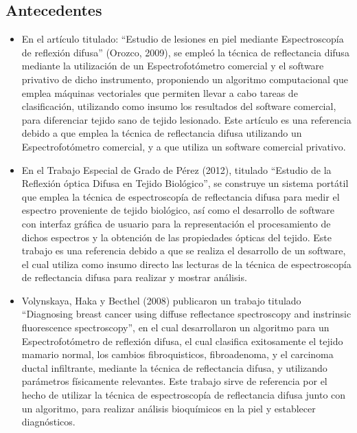 \documentclass[12pt, a4paper]{article}
\begin{document}
\subsection{Antecedentes}	
	\begin{itemize}
		\item En el art\'{i}culo titulado: “Estudio de lesiones en piel mediante Espectroscop\'{i}a de reflexi\'{o}n difusa” (Orozco, 2009), se emple\'{o} la t\'{e}cnica de reflectancia difusa mediante la utilizaci\'{o}n de un Espectrofot\'{o}metro comercial y el software privativo de dicho instrumento, proponiendo un algoritmo computacional que emplea m\'{a}quinas vectoriales que permiten llevar a cabo tareas de clasificaci\'{o}n, utilizando como insumo los resultados del software comercial, para diferenciar tejido sano de tejido lesionado. Este art\'{i}culo es una referencia debido a que emplea la t\'{e}cnica de reflectancia difusa utilizando un Espectrofot\'{o}metro comercial, y a que utiliza un software comercial privativo.
		\item En el Trabajo Especial de Grado de P\'{e}rez (2012), titulado “Estudio de la Reflexi\'{o}n \'{o}ptica Difusa en Tejido Biol\'{o}gico”, se construye un sistema port\'{a}til que emplea la t\'{e}cnica de espectroscop\'{i}a de reflectancia difusa para medir el espectro proveniente de tejido biol\'{o}gico, as\'{i} como el desarrollo de software con interfaz gr\'{a}fica de usuario para la representaci\'{o}n el procesamiento de dichos espectros y la obtenci\'{o}n de las propiedades \'{o}pticas del tejido. Este trabajo es una referencia debido a que se realiza el desarrollo de un software, el cual utiliza como insumo directo las lecturas de la t\'{e}cnica de espectroscop\'{i}a de reflectancia difusa para realizar y mostrar an\'{a}lisis.
		\item Volynskaya, Haka y Becthel (2008) publicaron un trabajo titulado “Diagnosing breast cancer using diffuse reflectance spectroscopy and instrinsic fluorescence spectroscopy”, en el cual desarrollaron un algoritmo para un Espectrofot\'{o}metro de reflexi\'{o}n difusa, el cual clasifica exitosamente el tejido mamario normal, los cambios fibroquisticos, fibroadenoma, y el carcinoma ductal infiltrante, mediante la t\'{e}cnica de reflectancia difusa, y utilizando par\'{a}metros f\'{i}sicamente relevantes. Este trabajo sirve de referencia por el hecho de utilizar la t\'{e}cnica de espectroscop\'{i}a de reflectancia difusa junto con un algoritmo, para realizar an\'{a}lisis bioqu\'{i}micos en la piel y establecer diagn\'{o}sticos.
	\end{itemize}
	
\end{document}
